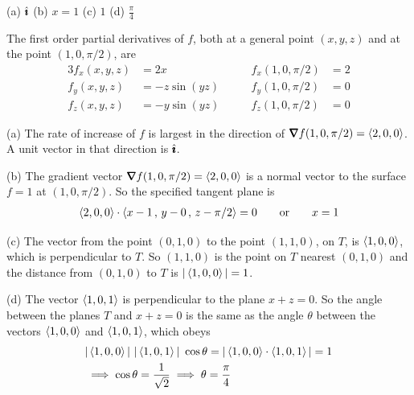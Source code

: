 %

\begin{answer}
(a) $\hat{\pmb{\imath}}$\qquad
(b) $x=1$\qquad
(c) $1$\qquad
(d) $\frac{\pi}{4}$
\end{answer}

\begin{solution}
The first order partial derivatives of $f$, both at a general point 
$(x,y,z)$ and at the point $(1, 0, \pi/2)$, are
\begin{alignat*}{3}
f_x(x,y,z)&= 2x\qquad &
     f_x(1, 0, \pi/2)&= 2 \\
f_y(x,y,z)&= -z\sin(yz)\qquad &
     f_y(1, 0, \pi/2)&= 0 \\
f_z(x,y,z)&= -y\sin(yz)\qquad &
     f_z(1, 0, \pi/2)&= 0 
\end{alignat*}

(a) The rate of increase of $f$ is largest in the direction of 
$\vnabla f(1, 0, \pi/2)=\llt 2,0,0\rgt$. A unit vector in that direction
is $\hat{\pmb{\imath}}$.

(b) The gradient vector $\vnabla f(1, 0, \pi/2)=\llt 2,0,0\rgt$ is a normal
vector to the surface $f=1$ at $(1, 0, \pi/2)$. So the specified tangent
plane is
\begin{align*}
\left< 2,0,0\right> \cdot \left< x-1\,,\,y-0\,,\,z-\pi/2\right>=0\qquad\text{or}\qquad
x=1
\end{align*} 

(c) The vector from the point $(0,1,0)$ to the point $(1,1,0)$, on $T$,
is $\left< 1,0,0\right>$, which is perpendicular to $T$. So $(1,1,0)$
is the point on $T$ nearest $(0,1,0)$  and the distance from $(0,1,0)$ to $T$
is $|\left< 1,0,0\right>|=1$.

(d) The vector $\left< 1,0,1\right>$ is perpendicular to the plane $x+z=0$.
So the angle between the planes $T$ and $x+z=0$ is the same as the angle
$\theta$ between the vectors $\left< 1,0,0\right>$ and $\left< 1,0,1\right>$,
which obeys
\begin{align*}
& |\left< 1,0,0\right>| \ |\left< 1,0,1\right>|\ \cos\theta 
   =|\left< 1,0,0\right>\cdot\left< 1,0,1\right>| 
   =1 \\
&\implies \cos\theta=\frac{1}{\sqrt{2}}
\implies  \theta=\frac{\pi}{4} 
\end{align*}
\end{solution}

